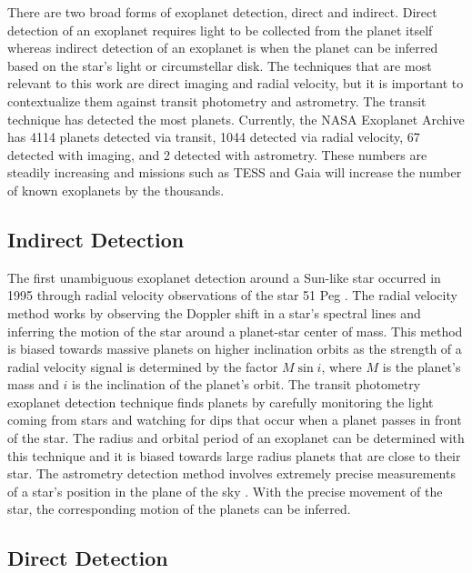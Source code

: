There are two broad forms of exoplanet detection, direct and indirect. Direct
detection of an exoplanet requires light to be collected from the planet itself
whereas indirect detection of an exoplanet is when the planet can be inferred
based on the star's light or circumstellar disk. The techniques that are most
relevant to this work are direct imaging and radial velocity, but it is
important to contextualize them against transit photometry and astrometry. The
transit technique has detected the most planets. Currently, the NASA Exoplanet
Archive has 4114 planets detected via transit, 1044 detected via radial
velocity, 67 detected with imaging, and 2 detected with astrometry. These
numbers are steadily increasing and missions such as TESS \citep{Huang2018} and
Gaia \citep{Perryman2018a} will increase the number of known exoplanets by the
thousands.

\subsection{Indirect Detection} 

The first unambiguous exoplanet detection around a Sun-like star occurred in
1995 through radial velocity observations of the star 51 Peg
\citep{mayorJupitermassCompanion1995}. The radial velocity method works by
observing the Doppler shift in a star's spectral lines and inferring the motion
of the star around a planet-star center of mass. This method is biased towards
massive planets on higher inclination orbits as the strength of a radial
velocity signal is determined by the factor $M\sin{i}$, where $M$ is the
planet's mass and $i$ is the inclination of the planet's orbit. The transit
photometry exoplanet detection technique finds planets by carefully monitoring
the light coming from stars and watching for dips that occur when a planet
passes in front of the star. The radius and orbital period of an exoplanet can
be determined with this technique and it is biased towards large radius planets
that are close to their star. The astrometry detection method involves
extremely precise measurements of a star's position in the plane of the sky
\citep{Perryman2018a}. With the precise movement of the star, the corresponding
motion of the planets can be inferred.


\subsection{Direct Detection}

